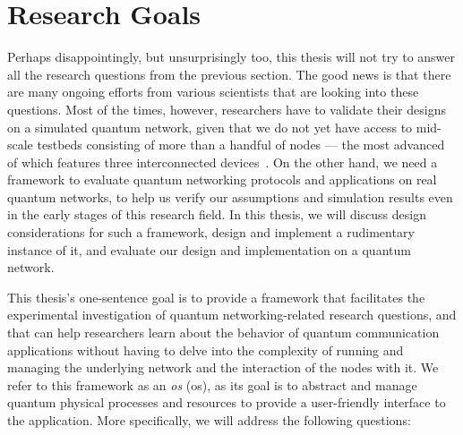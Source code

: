 \section{Research Goals}

Perhaps disappointingly, but unsurprisingly too, this thesis will not try to answer all the research
questions from the previous section. The good news is that there are many ongoing efforts from
various scientists that are looking into these questions. Most of the times, however, researchers
have to validate their designs on a simulated quantum network, given that we do not yet have access
to mid-scale testbeds consisting of more than a handful of nodes --- the most advanced of which
features three interconnected devices~\cite{pompili_2021_multinode}. On the other hand, we need a
framework to evaluate quantum networking protocols and applications on real quantum networks, to
help us verify our assumptions and simulation results even in the early stages of this research
field. In this thesis, we will discuss design considerations for such a framework, design and
implement a rudimentary instance of it, and evaluate our design and implementation on a quantum
network.

This thesis's one-sentence goal is to provide a framework that facilitates the experimental
investigation of quantum networking-related research questions, and that can help researchers learn
about the behavior of quantum communication applications without having to delve into the complexity
of running and managing the underlying network and the interaction of the nodes with it. We refer to
this framework as an \emph{\acrlong{os}} (\acrshort{os}), as its goal is to abstract and manage
quantum physical processes and resources to provide a user-friendly interface to the application.
More specifically, we will address the following questions:

